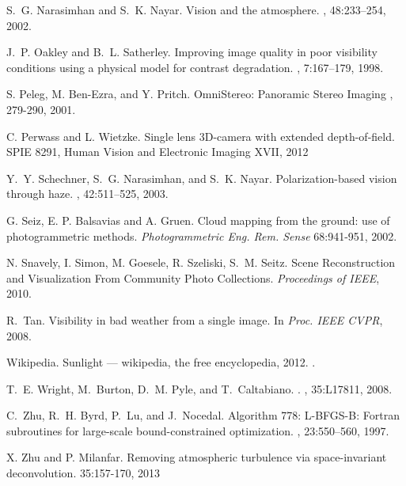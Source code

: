 \documentclass[10pt,twocolumn,letterpaper]{article}
\begin{document}
{\begin{thebibliography}{10}
   S.~G. Narasimhan and S.~K. Nayar.  \newblock
    Vision and the atmosphere.  , 48:233--254, 2002.

   J.~P. Oakley and B.~L. Satherley.  \newblock
    Improving image quality in poor visibility conditions using a
    physical model for contrast degradation.  , 7:167--179, 1998.

   S. Peleg, M. Ben-Ezra, and Y. Pritch.  \newblock
    OmniStereo: Panoramic Stereo Imaging , 279-290, 2001.

   C. Perwass and L. Wietzke.  \newblock Single lens
    3D-camera with extended depth-of-field.  \newblock SPIE 8291,
    Human Vision and Electronic Imaging XVII, 2012

   Y.~Y. Schechner, S.~G. Narasimhan, and
    S.~K. Nayar.  \newblock Polarization-based vision through haze.
    , 42:511--525, 2003.

   G. Seiz, E. P. Balsavias and A. Gruen.  Cloud mapping
    from the ground: use of photogrammetric methods.  {\em
      Photogrammetric Eng. Rem. Sense} 68:941-951, 2002.

   \newblock N. Snavely, I. Simon, M. Goesele,
    R. Szeliski, S.~M. Seitz.  \newblock Scene Reconstruction and
    Visualization From Community Photo Collections.  {\em Proceedings
      of IEEE}, 2010.

   R.~Tan.  \newblock Visibility in bad weather from a
    single image.  \newblock In {\em Proc. IEEE CVPR}, 2008.

   Wikipedia.  \newblock Sunlight ---
    wikipedia{,} the free encyclopedia, 2012.  .

   T.~E. Wright, M.~Burton, D.~M. Pyle, and
    T.~Caltabiano.  .  ,
    35:L17811, 2008.

   C.~Zhu, R.~H. Byrd, P.~Lu, and J.~Nocedal.  \newblock
    Algorithm 778: L-BFGS-B: Fortran subroutines for large-scale
    bound-constrained optimization.  , 23:550--560, 1997.

   X. Zhu and P. Milanfar.  \newblock Removing
    atmospheric turbulence via space-invariant deconvolution.
     35:157-170, 2013

  \end{thebibliography}

}
\end{document}
